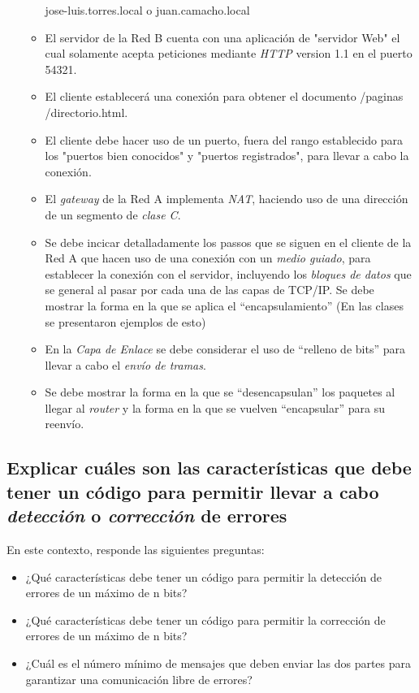 \documentclass[spanish,12pt,letterpaper]{article}
\begin{document}
\begin{itemize}
\begin{itemize}
    jose-luis.torres.local o juan.camacho.local
  \item El servidor de la Red B cuenta con una aplicación de "servidor Web" el
    cual solamente acepta peticiones mediante \textit{HTTP} version 1.1 en el
    puerto 54321.
  \item El cliente establecerá una conexión para obtener el documento /paginas
    /directorio.html.
  \item El cliente debe hacer uso de un puerto, fuera del rango establecido para
    los "puertos bien conocidos" y "puertos registrados", para llevar a cabo la
    conexión.
  \item El \textit{gateway} de la Red A implementa \textit{NAT}, haciendo uso de
    una dirección de un segmento de \textit{clase C}.
  \item Se debe incicar detalladamente los passos que se siguen en el cliente de
    la Red A que hacen uso de una conexión con un \textit{medio guiado}, para
    establecer la conexión con el servidor, incluyendo los \textit{bloques de
      datos} que se general al pasar por cada una de las capas de TCP/IP. Se debe
    mostrar la forma en la que se aplica el ``encapsulamiento'' (En las clases se
    presentaron ejemplos de esto)
  \item En la \textit{Capa de Enlace} se debe considerar el uso de ``relleno de
    bits'' para llevar a cabo el \textit{envío de tramas}.
  \item Se debe mostrar la forma en la que se ``desencapsulan'' los paquetes al
    llegar al \textit{router} y la forma en la que se vuelven ``encapsular'' para
    su reenvío.
  \end{itemize}
\end{itemize}

\subsection{Explicar cuáles son las características que debe tener un código para
  permitir llevar a cabo \textit{detección} o \textit{corrección} de errores}

En este contexto, responde las siguientes preguntas:
\begin{itemize}
\item ¿Qué características debe tener un código para permitir la detección de
  errores de un máximo de n bits?
\item ¿Qué características debe tener un código para permitir la corrección de
  errores de un máximo de n bits?
\item ¿Cuál es el número mínimo de mensajes que deben enviar las dos partes para
  garantizar una comunicación libre de errores?
\end{itemize}
\end{document}
